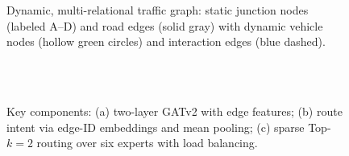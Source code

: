 \begin{figure}[t]
    \centering
    \caption{Dynamic, multi-relational traffic graph: static junction nodes (labeled A--D) and road edges (solid gray) with dynamic vehicle nodes (hollow green circles) and interaction edges (blue dashed).}
    \label{fig:dyn-graph}
\end{figure}

\begin{figure}[t]
    \centering
    \\[2mm]
    \\[2mm]
    \caption{Key components: (a) two-layer GATv2 with edge features; (b) route intent via edge-ID embeddings and mean pooling; (c) sparse Top-$k=2$ routing over six experts with load balancing.}
    \label{fig:components}
\end{figure}


